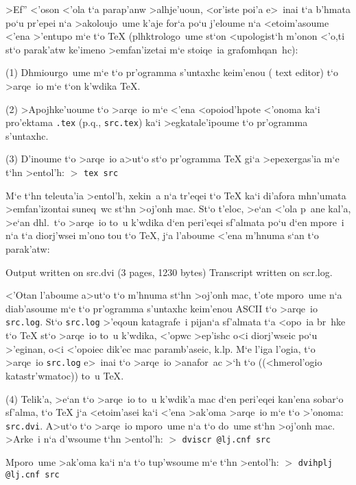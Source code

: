>Ef'' <'oson <'ola t`a parap'anw >alhje'uoun, <or'iste poi'a e>~inai t`a
b'hmata po`u pr'epei n`a >ako\-lou\-jo~ume {\tengb k'aje for`a} po`u
j'eloume n`a <etoim'asoume <'ena >'entupo m`e t`o {\rm \TeX}
(plh\-ktro\-lo\-go~ume st`on <upologist`h m'onon <'o,ti st`o parak'atw
ke'imeno >emfan'izetai m`e stoiqe~ia gra\-fo\-mhqa\-n~hc):

\item{(1)} Dhmiourgo~ume m`e t`o pr'ogramma s'untaxhc keim'enou ({\rm
  text editor}) t`o >arqe~io m`e t`on k'wdika {\rm \TeX}.

\item{(2)} >Apojhke'uoume t`o >arqe~io m`e <'ena <opoiod'hpote <'onoma
  ka`i pro'ektama {\tt .tex} (p.q., {\tt src.tex}) ka`i >egkatale'ipoume
  t`o pr'ogramma s'untaxhc.

\item{(3)} D'inoume t`o >arqe~io a>ut`o st`o pr'ogramma {\rm \TeX} gi`a
>epexergas'ia m`e t`hn >entol'h:
    \itemitem{} $>$ {\tt tex src}

M`e t`hn teleuta'ia >entol'h, xekin~a n`a tr'eqei t`o {\rm \TeX} ka`i   
di'afora mhn'umata >emfan'izontai suneq~wc st`hn >oj'onh mac. St`o
t'eloc, >e`an <'ola p~ane kal'a, >e`an dhl.\ t`o >arqe~io to~u k'wdika  
d`en peri'eqei sf'almata po`u d`en mpore~i n`a t`a diorj'wsei m'ono tou
t`o {\rm \TeX}, j`a l'aboume <'ena m'hnuma s`an t`o parak'atw:

\beginuser
Output written on src.dvi (3 pages, 1230 bytes)
Transcript written on scr.log.
\enduser

<'Otan l'aboume a>ut`o t`o m'hnuma st`hn >oj'onh mac, t'ote mporo~ume
n`a diab'asoume m`e t`o pr'ogramma s'untaxhc keim'enou {\rm ASCII} t`o
>arqe~io {\tt src.log}.  St`o {\tt src.log} >'eqoun katagrafe~i pijan`a
sf'almata t`a <opo~ia br~hke t`o {\rm \TeX} st`o >arqe~io to~u k'wdika,
<'opwc >ep'ishc o<i diorj'wseic po`u >'eginan, o<i <'opoiec dik'ec mac
paramb'aseic, k.lp.  M`e l'iga l'ogia, t`o >arqe~io {\tt src.log}
e>~inai t`o {\tengs >arqe~io >anafor~ac\/} >`h t`o ((<hmerol'ogio
katastr'wmatoc)) to~u {\rm \TeX}. 

\item{(4)}  Telik'a, >e`an t`o >arqe~io to~u k'wdik'a mac d`en peri'eqei
kan'ena sobar`o sf'alma, t`o {\rm \TeX} j`a <etoim'asei ka`i <'ena
>ak'oma >arqe~io m`e t`o >'onoma: {\tt src.dvi}.  A>ut`o t`o >arqe~io
mporo~ume n`a t`o do~ume st`hn >oj'onh mac.  >Arke~i n`a d'wsoume t`hn
>entol'h:
\itemitem{} $>$ {\tt dviscr @lj.cnf src}

Mporo~ume >ak'oma ka`i n`a t`o tup'wsoume m`e t`hn >entol'h:
\itemitem{} $>$ {\tt dvihplj @lj.cnf src}

